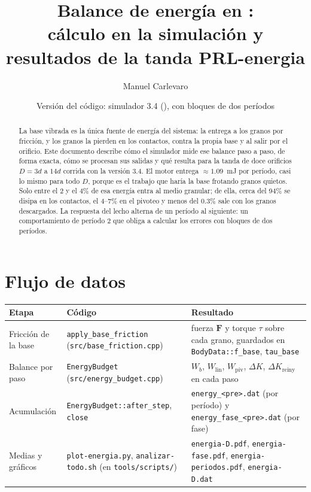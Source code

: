 \documentclass[11pt,a4paper]{article}
\title{Balance de energía en \code{unav-walkers}:\\
  cálculo en la simulación y resultados de la tanda PRL-energia}
\author{Manuel Carlevaro}
\date{Versión del código: simulador 3.4 (\code{f1f8462}),
  \code{plot-energia.py} con bloques de dos períodos}
\newcommand{\vect}[1]{\mathbf{#1}}
\newcommand{\F}{\vect{F}}
\newcommand{\code}[1]{\texttt{#1}}
\newcommand{\Wb}{W_b}
\newcommand{\Wlin}{W_\text{lin}}
\newcommand{\Wpiv}{W_\text{piv}}
\newcommand{\dKr}{\Delta K_\text{reiny}}
\begin{document}
\maketitle

\begin{abstract}
  La base vibrada es la única fuente de energía del sistema: la entrega a
  los granos por fricción, y los granos la pierden en los contactos, contra
  la propia base y al salir por el orificio. Este documento describe cómo
  el simulador mide ese balance paso a paso, de forma exacta, cómo se
  procesan sus salidas y qué resulta para la tanda de doce orificios
  $D = 3d$ a $14d$ corrida con la versión 3.4. El motor entrega
  $\approx 1.09$~mJ por período, casi lo mismo para todo $D$, porque es el
  trabajo que haría la base frotando granos quietos. Solo entre el 2 y el
  4\% de esa energía entra al medio granular; de ella, cerca del 94\%
  se disipa en los contactos, el 4--7\% en el pivoteo y menos del 0.3\%
  sale con los granos descargados. La respuesta del lecho alterna de un
  período al siguiente: un comportamiento de período 2 que obliga a
  calcular los errores con bloques de dos períodos.
\end{abstract}

\tableofcontents

\section{Flujo de datos}

\begin{center}
\small
\begin{tabular}{>{\raggedright}p{}>{\raggedright}p{}p{}}
  \toprule
  Etapa & Código & Resultado \\
  \midrule
  Fricción de la base & \code{apply\_base\_friction}
      (\code{src/base\_friction.cpp})
      & fuerza $\F$ y torque $\tau$ sobre cada grano, guardados en
        \code{BodyData::f\_base}, \code{tau\_base} \\
  Balance por paso & \code{EnergyBudget} (\code{src/energy\_budget.cpp})
      & $\Wb$, $\Wlin$, $\Wpiv$, $\Delta K$, $\dKr$ en cada paso \\
  Acumulación & \code{EnergyBudget::after\_step}, \code{close}
      & \code{energy\_<pre>.dat} (por período) y
        \code{energy\_fase\_<pre>.dat} (por fase) \\
  Medias y gráficos & \code{plot-energia.py}, \code{analizar-todo.sh}
      (en \code{tools/scripts/})
      & \code{energia-D.pdf}, \code{energia-fase.pdf},
        \code{energia-periodos.pdf}, \code{energia-D.dat} \\
  \bottomrule
\end{tabular}
\end{center}
\end{document}
